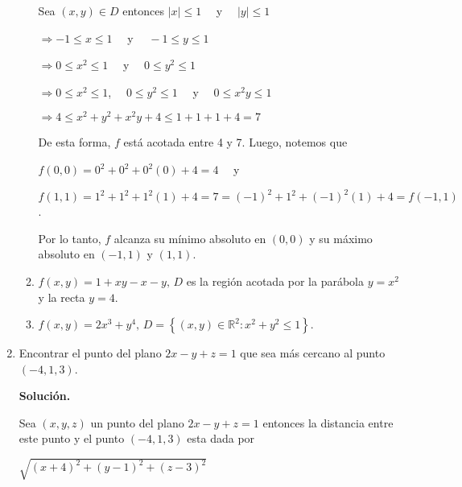 \documentclass[fleqn, 12pt]{article}
\begin{document}
\begin{enumerate}
\begin{enumerate}
            Sea $ (x,y) \in D $ entonces $ \lvert x \rvert \leq 1 \quad $ y $ \quad \lvert y \rvert \leq 1 $

            $ \Longrightarrow -1 \leq x \leq 1 \quad $ y $ \quad -1 \leq y \leq 1 $

            $ \Longrightarrow 0 \leq x^2 \leq 1 \quad $ y $ \quad 0 \leq y^2 \leq 1 $

            $ \Longrightarrow 0 \leq x^2 \leq 1 $, $ \quad 0 \leq y^2 \leq 1 \quad $ y $ \quad 0 \leq x^2 y \leq 1 $

            $ \Longrightarrow 4 \leq x^2 + y^2 + x^2 y + 4 \leq 1 + 1 + 1 + 4 = 7 $

            De esta forma, $ f $ está acotada entre 4 y 7. Luego, notemos que 
            
            $ f(0,0) = 0^2 + 0^2 + 0^2 (0) + 4 = 4 \quad $ y 
            
            $ f(1,1) = 1^2 + 1^2 + 1^2 (1) + 4 = 7 = (-1)^2 + 1^2 + (-1)^2 (1) + 4 = f(-1,1) $.

            Por lo tanto, $ f $ alcanza su mínimo absoluto en $ (0,0) $ y su máximo absoluto en $ (-1,1) $ y $ (1,1) $.

            \item $ f(x,y) = 1 + xy - x - y, \, D $ es la región acotada por la parábola $ y = x^2 $ y la recta $ y = 4 $.
            

            \item $ f(x,y) = 2x^3 + y^4, \, D = \left\lbrace (x,y) \in \mathbb{R}^2 : x^2 + y^2 \leq 1 \right\rbrace $.
            
        \end{enumerate}
        \item Encontrar el punto del plano $ 2x - y + z = 1 $ que sea más cercano al punto $ (-4,1,3) $.

        \textbf{Solución.}
        
        Sea $ (x,y,z) $ un punto del plano $ 2x - y + z = 1 $ entonces la distancia entre este punto y el punto $ (-4,1,3) $ esta dada por 

        $ \sqrt{(x + 4)^2 + (y - 1)^2 + (z - 3)^2} $


\end{enumerate}
\end{document}

